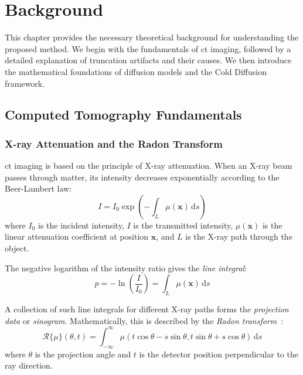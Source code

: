 \chapter{Background}
\label{ch:background}

This chapter provides the necessary theoretical background for understanding the proposed method. We begin with the fundamentals of \gls{ct} imaging, followed by a detailed explanation of truncation artifacts and their causes. We then introduce the mathematical foundations of diffusion models and the Cold Diffusion framework.

\section{Computed Tomography Fundamentals}

\subsection{X-ray Attenuation and the Radon Transform}

\gls{ct} imaging is based on the principle of X-ray attenuation. When an X-ray beam passes through matter, its intensity decreases exponentially according to the Beer-Lambert law:
%
\begin{equation}
I = I_0 \exp\left(-\int_L \mu(\mathbf{x}) \, \mathrm{d}s\right)
\end{equation}
%
where $I_0$ is the incident intensity, $I$ is the transmitted intensity, $\mu(\mathbf{x})$ is the linear attenuation coefficient at position $\mathbf{x}$, and $L$ is the X-ray path through the object.

The negative logarithm of the intensity ratio gives the \textit{line integral}:
%
\begin{equation}
p = -\ln\left(\frac{I}{I_0}\right) = \int_L \mu(\mathbf{x}) \, \mathrm{d}s
\label{eq:line_integral}
\end{equation}

A collection of such line integrals for different X-ray paths forms the \textit{projection data} or \textit{sinogram}. Mathematically, this is described by the \textit{Radon transform}~\cite{kak2001principles}:
%
\begin{equation}
\mathcal{R}\{\mu\}(\theta, t) = \int_{-\infty}^{\infty} \mu(t\cos\theta - s\sin\theta, t\sin\theta + s\cos\theta) \, \mathrm{d}s
\label{eq:radon_transform}
\end{equation}
%
where $\theta$ is the projection angle and $t$ is the detector position perpendicular to the ray direction.

